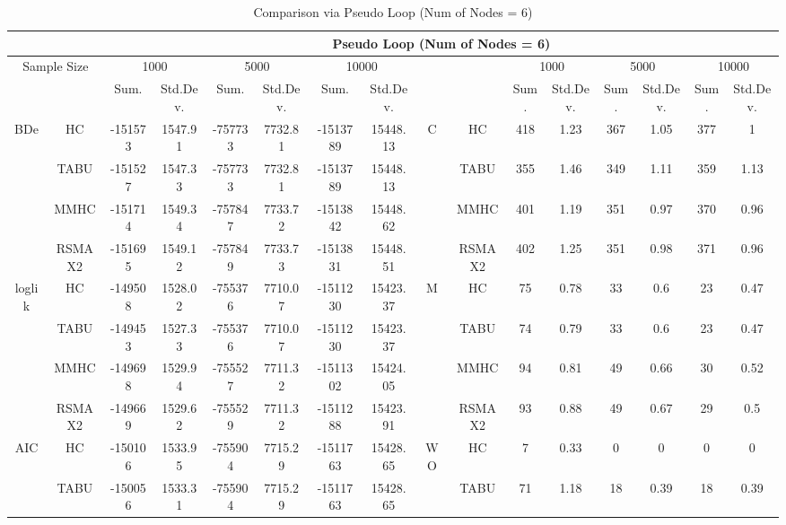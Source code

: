 \begin{table}[p]																										
\centering	\caption{Comparison via Pseudo Loop (Num of Nodes = 6)}	\tiny																						
{\tabcolsep=0.01in																										
\begin{tabular}{cc||cc|cc|cc||cc|cc|cc|cc}																										
\hline																										
&	&	\multicolumn{14}{c}{Pseudo Loop	(Num	of	Nodes	=	6)}\tabularnewline																			
\hline																										
\multicolumn{2}{c||}{Sample	Size}	&	\multicolumn{2}{c|}{1000}	&	\multicolumn{2}{c|}{5000}	&	\multicolumn{2}{c||}{10000}	&	&	&	\multicolumn{2}{c|}{1000}	&	\multicolumn{2}{c|}{5000}	&	\multicolumn{2}{c}{10000}\tabularnewline											
\hline																										
&	&	Sum.	&	Std.Dev.	&	Sum.	&	Std.Dev.	&	Sum.	&	Std.Dev.	&	&	&	Sum.	&	Std.Dev.	&	Sum.	&	Std.Dev.	&	Sum.	&	Std.Dev.\tabularnewline
\hline																										
\hline																										
\multirow{4}{*}{BDe} & HC &	-151573 & 	1547.91 & 	-757733 & 	7732.81 & 	-1513789 & 	15448.13 & 	\multirow{4}{*}{C} & HC &	418 & 	1.23 & 	367 & 	1.05 & 	377 & 	1\tabularnewline													
& TABU &	-151527 & 	1547.33 & 	-757733 & 	7732.81 & 	-1513789 & 	15448.13 & 	& TABU &	355 & 	1.46 & 	349 & 	1.11 & 	359 & 	1.13\tabularnewline													
& MMHC &	-151714 & 	1549.34 & 	-757847 & 	7733.72 & 	-1513842 & 	15448.62 & 	& MMHC &	401 & 	1.19 & 	351 & 	0.97 & 	370 & 	0.96\tabularnewline													
& RSMAX2 &	-151695 & 	1549.12 & 	-757849 & 	7733.73 & 	-1513831 & 	15448.51 & 	& RSMAX2 &	402 & 	1.25 & 	351 & 	0.98 & 	371 & 	0.96\tabularnewline													
\hline																										
\multirow{4}{*}{loglik} & HC &	-149508 & 	1528.02 & 	-755376 & 	7710.07 & 	-1511230 & 	15423.37 & 	\multirow{4}{*}{M} & HC &	75 & 	0.78 & 	33 & 	0.6 & 	23 & 	0.47\tabularnewline													
& TABU &	-149453 & 	1527.33 & 	-755376 & 	7710.07 & 	-1511230 & 	15423.37 & 	& TABU &	74 & 	0.79 & 	33 & 	0.6 & 	23 & 	0.47\tabularnewline													
& MMHC &	-149698 & 	1529.94 & 	-755527 & 	7711.32 & 	-1511302 & 	15424.05 & 	& MMHC &	94 & 	0.81 & 	49 & 	0.66 & 	30 & 	0.52\tabularnewline													
& RSMAX2 &	-149669 & 	1529.62 & 	-755529 & 	7711.32 & 	-1511288 & 	15423.91 & 	& RSMAX2 &	93 & 	0.88 & 	49 & 	0.67 & 	29 & 	0.5\tabularnewline													
\hline																										
\multirow{4}{*}{AIC} & HC &	-150106 & 	1533.95 & 	-755904 & 	7715.29 & 	-1511763 & 	15428.65 & 	\multirow{4}{*}{WO} & HC &	7 & 	0.33 & 	0 & 	0 & 	0 & 	0\tabularnewline													
& TABU &	-150056 & 	1533.31 & 	-755904 & 	7715.29 & 	-1511763 & 	15428.65 & 	& TABU &	71 & 	1.18 & 	18 & 	0.39 & 	18 & 	0.39\tabularnewline													

\end{tabular}}
\end{table}
